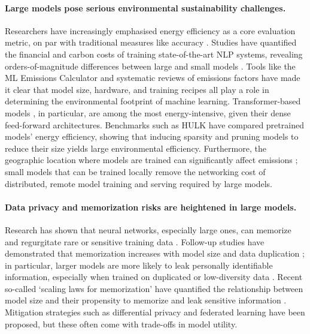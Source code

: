 \paragraph{Large models pose serious environmental sustainability challenges.} Researchers have increasingly emphasised energy efficiency as a core evaluation metric, on par with traditional measures like accuracy \citep{schwartz2020greenai}. Studies have quantified the financial and carbon costs of training state-of-the-art NLP systems, revealing orders-of-magnitude differences between large and small models \citep{strubell2019energy}. Tools like the ML Emissions Calculator \citep{lacoste2019quantifying} and systematic reviews of emissions factors \citep{luccioni2023counting} have made it clear that model size, hardware, and training recipes all play a role in determining the environmental footprint of machine learning. Transformer-based models \citep{vaswani2017attention}, in particular, are among the most energy-intensive, given their dense feed-forward architectures. Benchmarks such as HULK \citep{zhou2021hulk} have compared pretrained models' energy efficiency, showing that inducing sparsity and pruning models to reduce their size yields large environmental efficiency. Furthermore, the geographic location where models are trained can significantly affect emissions \citep{patterson2021carbon}; small models that can be trained locally remove the networking cost of distributed, remote model training and serving required by large models. 


\paragraph{Data privacy and memorization risks are heightened in large models.} Research has shown that neural networks, especially large ones, can memorize and regurgitate rare or sensitive training data \citep{feldman2020neural, carlini2019secret}. Follow-up studies have demonstrated that memorization increases with model size and data duplication \citep{carlini2021extracting, carlini2022quantifying}; in particular, larger models are more likely to leak personally identifiable information, especially when trained on duplicated or low-diversity data \citep{huang2022large, neel2023privacy}. Recent so-called `scaling laws for memorization' have quantified the relationship between model size and their propensity to memorize and leak sensitive information \citep{lu2024scaling, biderman2023emergent, kiyomaru2024comprehensive}. Mitigation strategies such as differential privacy \citep{dwork2006calibrating} and federated learning \citep{mcmahan2017communication} have been proposed, but these often come with trade-offs in model utility.%

